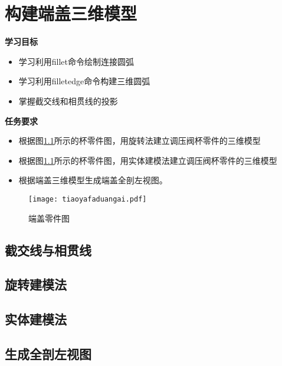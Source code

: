 \chapter{构建端盖三维模型}\label{chap:duangai}

{\bfseries 学习目标}
\begin{itemize}
\item 学习利用fillet命令绘制连接圆弧
\item 学习利用filletedge命令构建三维圆弧
\item 掌握截交线和相贯线的投影
\end{itemize}

{\bfseries 任务要求}
\begin{itemize}
\item 根据图\ref{fig:tiaoyafaduangai}所示的杯零件图，用旋转法建立调压阀杯零件的三维模型
\item 根据图\ref{fig:tiaoyafaduangai}所示的杯零件图，用实体建模法建立调压阀杯零件的三维模型
\item 根据端盖三维模型生成端盖全剖左视图。
\end{itemize}

\noindent
\begin{figure}[htbp]
\centering
\texttt{[image: tiaoyafaduangai.pdf]}
\caption{端盖零件图}\label{fig:tiaoyafaduangai}
\end{figure}
\clearpage
\section{截交线与相贯线}


\section{旋转建模法}


\section{实体建模法}

\section{生成全剖左视图}

\endinput